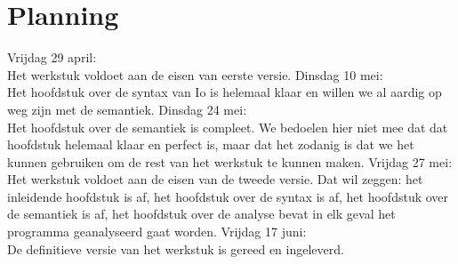 \documentclass[12pt]{article}
\begin{document}
\section{Planning}
Vrijdag 29 april: \\Het werkstuk voldoet aan de eisen van eerste versie.\newline\newline %
Dinsdag 10 mei: \\Het hoofdstuk over de syntax van Io is helemaal klaar en willen we al aardig op weg zijn met de semantiek.\newline\newline
Dinsdag 24 mei: \\Het hoofdstuk over de semantiek is compleet. We bedoelen hier niet mee dat dat hoofdstuk helemaal klaar en perfect is, maar
dat het zodanig is dat we het kunnen gebruiken om de rest van het werkstuk te kunnen maken.\newline\newline
Vrijdag 27 mei: \\Het werkstuk voldoet aan de eisen van de tweede versie. Dat wil zeggen: het inleidende hoofdstuk is af, het hoofdstuk over de syntax is af, het hoofdstuk over de semantiek is af, het hoofdstuk over de analyse bevat in elk geval het programma geanalyseerd gaat worden.\newline\newline
Vrijdag 17 juni: \\De definitieve versie van het werkstuk is gereed en ingeleverd.
\end{document}
